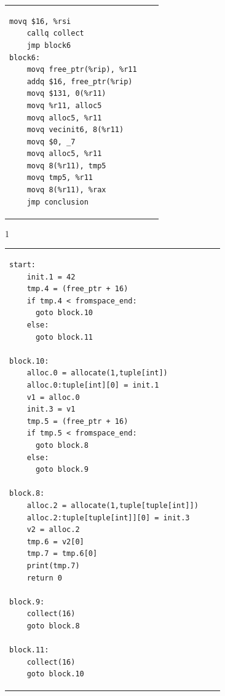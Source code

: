 \documentclass[7x10]{TimesAPriori_MIT}%
\def\pythonEd{1}
\def\edition{1}
\numberwithin{theorem}{chapter}
\numberwithin{definition}{chapter}
\numberwithin{equation}{chapter}
\begin{document}
\begin{figure}[tbp]
\begin{tcolorbox}[colback=white]
{\begin{tabular}{lll}
\begin{minipage}{0.4\textwidth}
\begin{lstlisting}[basicstyle=\ttfamily\scriptsize]
    movq $16, %rsi
    callq collect
    jmp block6
block6:
    movq free_ptr(%rip), %r11
    addq $16, free_ptr(%rip)
    movq $131, 0(%r11)
    movq %r11, alloc5
    movq alloc5, %r11
    movq vecinit6, 8(%r11)
    movq $0, _7
    movq alloc5, %r11
    movq 8(%r11), tmp5
    movq tmp5, %r11
    movq 8(%r11), %rax
    jmp conclusion
\end{lstlisting}
\end{minipage}
\end{tabular}
\fi}
{\if\edition\pythonEd    
\begin{tabular}{lll}
\begin{minipage}{0.5\textwidth}
\begin{lstlisting}[basicstyle=\ttfamily\scriptsize]
start:
    init.1 = 42
    tmp.4 = (free_ptr + 16)
    if tmp.4 < fromspace_end:
      goto block.10
    else:
      goto block.11

block.10:
    alloc.0 = allocate(1,tuple[int])
    alloc.0:tuple[int][0] = init.1
    v1 = alloc.0
    init.3 = v1
    tmp.5 = (free_ptr + 16)
    if tmp.5 < fromspace_end:
      goto block.8
    else:
      goto block.9

block.8:
    alloc.2 = allocate(1,tuple[tuple[int]])
    alloc.2:tuple[tuple[int]][0] = init.3
    v2 = alloc.2
    tmp.6 = v2[0]
    tmp.7 = tmp.6[0]
    print(tmp.7)
    return 0

block.9:
    collect(16)
    goto block.8

block.11:
    collect(16)
    goto block.10
\end{lstlisting}



    

    

\end{minipage}
\end{tabular}}
\end{tcolorbox}
\end{figure}
\end{document}
